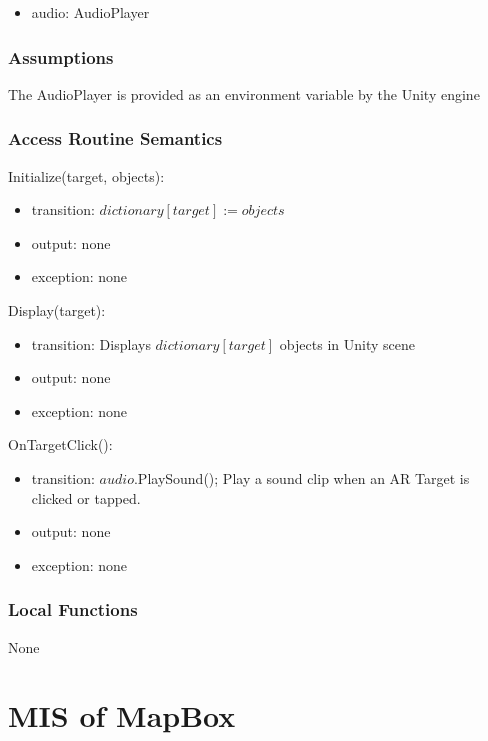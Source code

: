 \documentclass[12pt, titlepage]{article}
\begin{document}
\begin{itemize}
\item audio: AudioPlayer
\end{itemize}

\subsubsection{Assumptions}

The AudioPlayer is provided as an environment variable by the Unity engine

\subsubsection{Access Routine Semantics}

\noindent Initialize(target, objects):
\begin{itemize}
\item transition: $dictionary[target] := objects$
\item output: none
\item exception: none
\end{itemize}

\noindent Display(target):
\begin{itemize}
\item transition: Displays $dictionary[target]$ objects in Unity scene
\item output: none
\item exception: none
\end{itemize}

\noindent OnTargetClick():
\begin{itemize}
\item transition: $audio$.PlaySound(); Play a sound clip when an AR Target is clicked or tapped.
\item output: none
\item exception: none
\end{itemize}

\subsubsection{Local Functions}

None

\newpage

\section{MIS of MapBox} \label{mMap}
\end{document}
